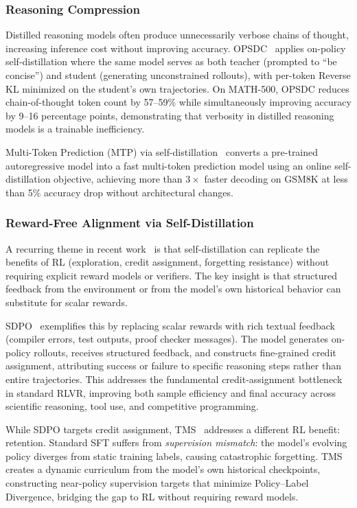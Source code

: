 \documentclass{article} %
\begin{document}
\subsubsection{Reasoning Compression}

Distilled reasoning models often produce unnecessarily verbose chains of thought, increasing inference cost without improving accuracy. OPSDC~\citep{2603.05433} applies on-policy self-distillation where the same model serves as both teacher (prompted to ``be concise'') and student (generating unconstrained rollouts), with per-token Reverse KL minimized on the student's own trajectories. On MATH-500, OPSDC reduces chain-of-thought token count by 57--59\% while simultaneously improving accuracy by 9--16 percentage points, demonstrating that verbosity in distilled reasoning models is a trainable inefficiency.

Multi-Token Prediction (MTP) via self-distillation~\citep{2602.06019} converts a pre-trained autoregressive model into a fast multi-token prediction model using an online self-distillation objective, achieving more than $3\times$ faster decoding on GSM8K at less than 5\% accuracy drop without architectural changes.

\subsubsection{Reward-Free Alignment via Self-Distillation}

A recurring theme in recent work~\citep{2601.20802,2602.03073,2603.23871,2601.19897} is that self-distillation can replicate the benefits of RL (exploration, credit assignment, forgetting resistance) without requiring explicit reward models or verifiers. The key insight is that structured feedback from the environment or from the model's own historical behavior can substitute for scalar rewards.

SDPO~\citep{2601.20802} exemplifies this by replacing scalar rewards with rich textual feedback (compiler errors, test outputs, proof checker messages). The model generates on-policy rollouts, receives structured feedback, and constructs fine-grained credit assignment, attributing success or failure to specific reasoning steps rather than entire trajectories. This addresses the fundamental credit-assignment bottleneck in standard RLVR, improving both sample efficiency and final accuracy across scientific reasoning, tool use, and competitive programming.

While SDPO targets credit assignment, TMS~\citep{2602.03073} addresses a different RL benefit: retention. Standard SFT suffers from \emph{supervision mismatch}: the model's evolving policy diverges from static training labels, causing catastrophic forgetting. TMS creates a dynamic curriculum from the model's own historical checkpoints, constructing near-policy supervision targets that minimize Policy--Label Divergence, bridging the gap to RL without requiring reward models.
\end{document}
